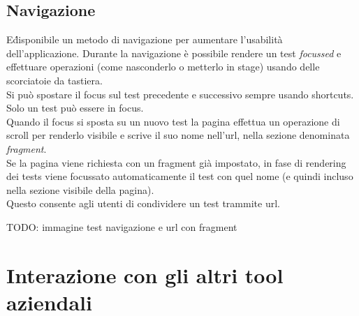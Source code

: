         \subsection{Navigazione}
            E\'  disponibile un metodo di navigazione per aumentare l'usabilità dell'applicazione.
            Durante la navigazione è possibile rendere un test \textit{focussed} e effettuare operazioni (come nasconderlo o metterlo in stage) usando delle scorciatoie da tastiera.\\
            Si può spostare il focus sul test precedente e successivo sempre usando shortcuts.
            Solo un test può essere in focus.\\
            Quando il focus si sposta su un nuovo test la pagina effettua un operazione di scroll per renderlo visibile e scrive il suo nome nell'url, nella sezione denominata \textit{fragment}.\\
            Se la pagina viene richiesta con un fragment già impostato, in fase di rendering dei tests viene focussato automaticamente il test con quel nome (e quindi incluso nella sezione visibile della pagina).\\
            Questo consente agli utenti di condividere un test trammite url.

            TODO: immagine test navigazione e url con fragment
    \section{Interazione con gli altri tool aziendali}